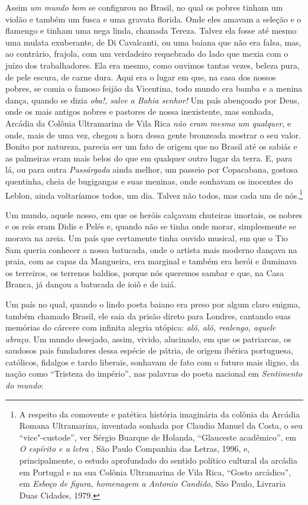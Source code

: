 Assim \emph{um mundo bom} se configurou no Brasil, no qual os pobres
tinham um violão e também um fusca e uma gravata florida. Onde eles
amavam a seleção e o flamengo e tinham uma nega linda, chamada Tereza.
Talvez ela fosse até mesmo uma mulata exuberante, de Di Cavalcanti, ou
uma baiana que não era falsa, mas, ao contrário, frajola, com um
verdadeiro requebrado do lado que mexia com o juízo dos trabalhadores.
Ela era mesmo, como ouvimos tantas vezes, beleza pura, de pele escura,
de carne dura. Aqui era o lugar em que, na casa dos nossos pobres, se
comia o famoso feijão da Vicentina, todo mundo era bamba e a menina
dança, quando se dizia \emph{oba!, salve a Bahia senhor!} Um país
abençoado por Deus, onde os mais antigos nobres e pastores de nossa
inexistente, mas sonhada, Arcádia da Colônia Ultramarina de Vila Rica
\emph{não eram mesmo um qualquer}, e onde, mais de uma vez, chegou a
hora dessa gente bronzeada mostrar o seu valor. Bonito por natureza,
parecia ser um fato de origem que no Brasil até os sabiás e as palmeiras
eram mais belos do que em qualquer outro lugar da terra. E, para lá, ou
para outra \emph{Passárgada} ainda melhor, um passeio por Copacabana,
gostosa quentinha, cheia de bugigangas e suas meninas, onde sonhavam os
inocentes do Leblon, ainda voltaríamos todos, um dia. Talvez não todos,
mas cada um de nós.\footnote{A respeito da comovente e patética história
  imaginária da colônia da Arcádia Romana Ultramarina, inventada sonhada
  por Claudio Manuel da Costa, o seu ``vice"-custode'', ver Sérgio
  Buarque de Holanda, ``Glauceste acadêmico'', em \emph{O espírito e a
  letra }, São Paulo Companhia das Letras, 1996, e, principalmente, o
  estudo aprofundado do sentido político cultural da arcádia em Portugal
  e na sua Colônia Ultramarina de Vila Rica, ``Gosto arcádico'', em
  \emph{Esboço de figura, homenagem a Antonio Candido}, São Paulo,
  Livraria Duas Cidades, 1979.}

Um mundo, aquele nosso, em que os heróis calçavam chuteiras imortais, os
nobres e os reis eram Didis e Pelés e, quando não se tinha onde morar,
simplesmente se morava na areia. Um país que certamente tinha ouvido
musical, em que o Tio Sam queria conhecer a nossa batucada, onde o
artista mais moderno dançava na praia, com as capas da Mangueira, era
marginal e também era herói e iluminava os terreiros, os terrenos
baldios, porque nós queremos sambar e que, na Casa Branca, já dançou a
batucada de ioiô e de iaiá.

Um país no qual, quando o lindo poeta baiano era preso por algum claro
enigma, também chamado Brasil, ele saia da prisão direto para Londres,
cantando suas memórias do cárcere com infinita alegria utópica:
\emph{alô, alô, realengo, aquele abraço}. Um mundo desejado, assim,
vivido, alucinado, em que os patriarcas, os saudosos pais fundadores
dessa espécie de pátria, de origem ibérica portuguesa, católicos,
fidalgos e tardo liberais, sonhavam de fato com o futuro mais digno, da
nação como ``Tristeza do império'', nas palavras do poeta nacional em
\emph{Sentimento do mundo}:


